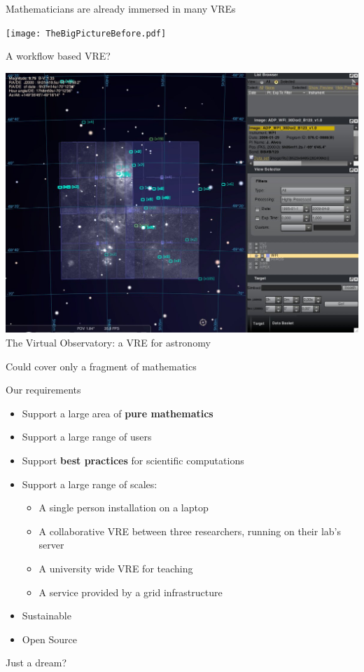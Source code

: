 \documentclass{beamer}
\begin{document}
\begin{frame}{Mathematicians are already immersed in many VREs}
  \begin{bigcenter}
    \texttt{[image: TheBigPictureBefore.pdf]}
  \end{bigcenter}
\end{frame}

\begin{frame}{A workflow based VRE?}
  \begin{center}
    \includegraphics[height=.7\textheight]{virtual_observatory.jpeg}\\
    {\tiny The Virtual Observatory: a VRE for astronomy}
  \end{center}
  \pause
  \centerline{\color{red} Could cover only a fragment of mathematics}
\end{frame}

\begin{frame}{Our requirements}
  \begin{itemize}
  \item Support a large area of \textbf{pure mathematics}
    \pause
  \item Support a large range of users
    \pause
  \item Support \textbf{best practices} for scientific computations
    \pause
  \item Support a large range of scales:
    \begin{itemize}
    \item A single person installation on a laptop
    \item A collaborative VRE between three researchers, running on
      their lab's server
    \item A university wide VRE for teaching
    \item A service provided by a grid infrastructure
    \end{itemize}
    \pause
  \item Sustainable
    \pause
  \item Open Source
  \end{itemize}
  \pause\bigskip
  \centerline{\color{red} Just a dream?}
\end{frame}
\end{document}

